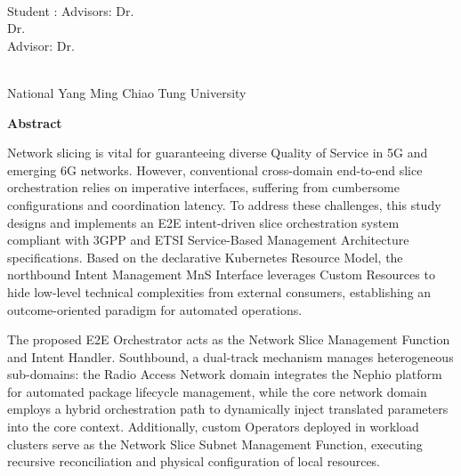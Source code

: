 \begin{center}
    \large
    
    \begin{singlespace}
        \textbf{\englishTitle{}} \\[0.5cm]
    \end{singlespace}
    
    \begin{singlespace}
        Student : \studentEnName{}  \hspace{1.0cm} 
        \ifdefined\advisorCnNameB
            Advisors: Dr.\, \advisorEnName \\
            \hspace{6.6cm} Dr.\, \advisorEnNameB  \\
        \else
            Advisor: Dr.\, \advisorEnName \\
        \fi
    \end{singlespace}
    
    \vspace{0.5cm}
    \begin{singlespace}
        \NameofDepartmentInstituteEN\\
        National Yang Ming Chiao Tung University\\[0.2cm]
    \end{singlespace}
    
    \textbf{Abstract} \\[0.5cm]

\end{center}

\normalsize 
  
Network slicing is vital for guaranteeing diverse Quality of Service in 5G and emerging 6G networks. However, conventional cross-domain end-to-end slice orchestration relies on imperative interfaces, suffering from cumbersome configurations and coordination latency. To address these challenges, this study designs and implements an E2E intent-driven slice orchestration system compliant with 3GPP and ETSI Service-Based Management Architecture specifications. Based on the declarative Kubernetes Resource Model, the northbound Intent Management MnS Interface leverages Custom Resources to hide low-level technical complexities from external consumers, establishing an outcome-oriented paradigm for automated operations.

The proposed E2E Orchestrator acts as the Network Slice Management Function and Intent Handler. Southbound, a dual-track mechanism manages heterogeneous sub-domains: the Radio Access Network domain integrates the Nephio platform for automated package lifecycle management, while the core network domain employs a hybrid orchestration path to dynamically inject translated parameters into the core context. Additionally, custom Operators deployed in workload clusters serve as the Network Slice Subnet Management Function, executing recursive reconciliation and physical configuration of local resources.

